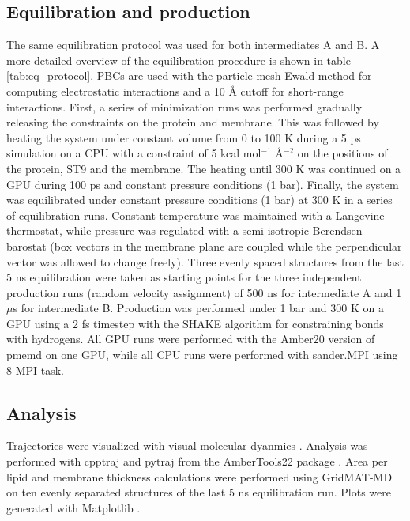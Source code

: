 \subsection{Equilibration and production}
The same equilibration protocol was used for both intermediates A and B. A more detailed overview of the equilibration procedure is shown in table \ref{tab:eq_protocol}. PBCs are used with the particle mesh Ewald method for computing electrostatic interactions \cite{Petersen1995} and a 10 Å cutoff for short-range interactions. First, a series of minimization runs was performed gradually releasing the constraints on the protein and membrane. This was followed by heating the system under constant volume from 0 to 100 K during a 5 ps simulation on a CPU with a constraint of 5 kcal mol$^{-1}$ Å$^{-2}$ on the positions of the protein, ST9 and the membrane. The heating until 300 K was continued on a GPU during 100 ps and constant pressure conditions (1 bar). Finally, the system was equilibrated under constant pressure conditions (1 bar) at 300 K in a series of equilibration runs. Constant temperature was maintained with a Langevine thermostat, while pressure was regulated with a semi-isotropic Berendsen barostat (box vectors in the membrane plane are coupled while the perpendicular vector was allowed to change freely). Three evenly spaced structures from the last 5 ns equilibration were taken as starting points for the three independent production runs (random velocity assignment) of 500 ns for intermediate A and 1 $\mu$s for intermediate B. Production was performed under 1 bar and 300 K on a GPU using a 2 fs timestep with the SHAKE algorithm \cite{Tobias1988} for constraining bonds with hydrogens. All GPU runs were performed with the Amber20 version of pmemd \cite{pmemd1,pmemd2} on one GPU, while all CPU runs were performed with sander.MPI using 8 MPI task. 

\subsection{Analysis}
Trajectories were visualized with visual molecular dyanmics \cite{HUMP96,STON1998}. Analysis was performed with cpptraj and pytraj from the AmberTools22 package \cite{Roe2013}. Area per lipid and membrane thickness calculations were performed using GridMAT-MD \cite{Allen2009} on ten evenly separated structures of the last 5 ns equilibration run. Plots were generated with Matplotlib \cite{Hunter2007}.   

